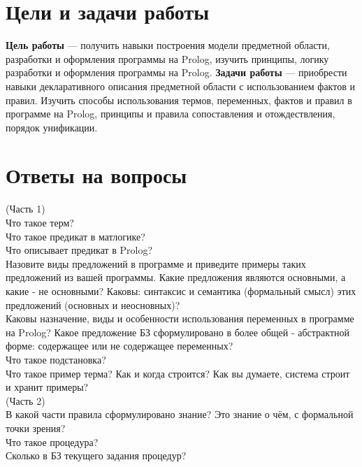 \chapter{Цели и задачи работы}
\textbf{Цель работы} --- получить навыки построения модели предметной области, разработки и оформления программы на Prolog, изучить принципы, логику  разработки и оформления программы на Prolog.
\textbf{Задачи работы} --- приобрести навыки декларативного описания предметной области с использованием фактов и правил. Изучить способы использования термов, переменных, фактов и правил в программе на Prolog, принципы и правила сопоставления и отождествления, порядок унификации.

\chapter{Ответы на вопросы}
(Часть 1)\\
Что такое терм?\\

Что такое предикат в матлогике?\\

Что описывает предикат в Prolog?\\

Назовите виды предложений в программе и приведите примеры таких предложений из вашей программы. Какие предложения являются основными, а какие - не основными? Каковы: синтаксис и семантика (формальный смысл) этих предложений (основных и неосновных)?\\

Каковы назначение, виды и особенности использования переменных в программе на Prolog? Какое предложение БЗ сформулировано в более общей - абстрактной форме: содержащее или не содержащее переменных?\\

Что такое подстановка?\\

Что такое пример терма? Как и когда строится? Как вы думаете, система строит и хранит примеры?\\

(Часть 2)\\
В какой части правила сформулировано знание? Это знание о чём, с формальной точки зрения?\\

Что такое процедура?\\

Сколько в БЗ текущего задания процедур?\\

